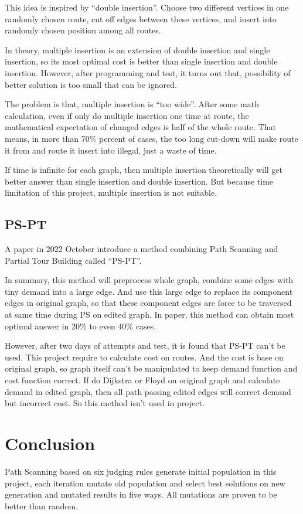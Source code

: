 \documentclass[journal]{IEEEtran}
\begin{document}
	This idea is inspired by ``double insertion''. Choose two different vertices in one randomly chosen route, cut off edges between these vertices, and insert into randomly chosen position among all routes.  
	
	In theory, multiple insertion is an extension of double insertion and single insertion, so its most optimal cost is better than single insertion and double insertion. However, after programming and test, it turns out that, possibility of better solution is too small that can be ignored.
	
	The problem is that, multiple insertion is ``too wide''. After some math calculation, even if only do multiple insertion one time at route, the mathematical expectation of changed edges is half of the whole route. That means, in more than 70\% percent of cases, the too long cut-down will make route it from and route it insert into illegal, just a waste of time.
	
	If time is infinite for each graph, then multiple insertion theoretically will get better answer than single insertion and double insertion. But because time limitation of this project, multiple insertion is not suitable.
	
	\subsection{PS-PT}
	
	A paper\cite{inproceedings} in 2022 October introduce a method combining Path Scanning and Partial Tour Building called ``PS-PT''.
	
	In summary, this method will preprocess whole graph, combine some edges with tiny demand into a large edge. And use this large edge to replace its component edges in original graph, so that these component edges are force to be traversed at same time during PS on edited graph. In paper, this method can obtain most optimal answer in 20\% to even 40\% cases.
	
	However, after two days of attempts and test, it is found that PS-PT can't be used. This project require to calculate cost on routes. And the cost is base on original graph, so graph itself can't be manipulated to keep demand function and cost function correct. If do Dijkstra or Floyd on original graph and calculate demand in edited graph, then all path passing edited edges will correct demand but incorrect cost. So this method isn't used in project.
	
	\section{Conclusion}
	Path Scanning based on six judging rules generate initial population in this project, each iteration mutate old population and select best solutions on new generation and mutated results in five ways. All mutations are proven to be better than random.
	
\end{document}
